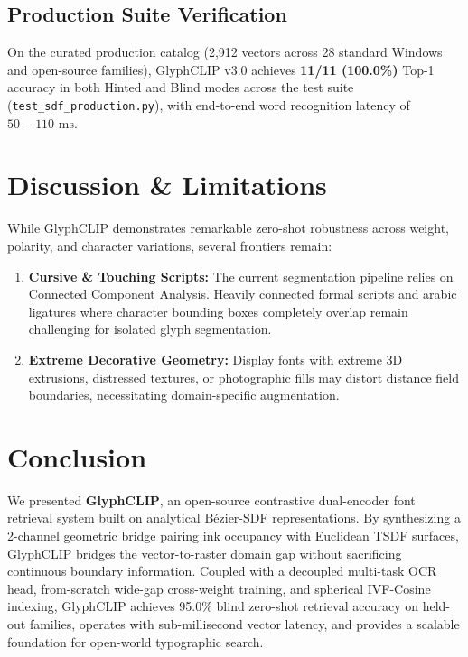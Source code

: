 \documentclass[10pt,twocolumn,letterpaper]{article}
\begin{document}
\subsection{Production Suite Verification}
On the curated production catalog (2,912 vectors across 28 standard Windows and open-source families), GlyphCLIP v3.0 achieves \textbf{11/11 (100.0\%)} Top-1 accuracy in both Hinted and Blind modes across the test suite (\texttt{test\_sdf\_production.py}), with end-to-end word recognition latency of $50 - 110\text{ ms}$.

\section{Discussion \& Limitations}
While GlyphCLIP demonstrates remarkable zero-shot robustness across weight, polarity, and character variations, several frontiers remain:
\begin{enumerate}
    \item \textbf{Cursive \& Touching Scripts:} The current segmentation pipeline relies on Connected Component Analysis. Heavily connected formal scripts and arabic ligatures where character bounding boxes completely overlap remain challenging for isolated glyph segmentation.
    \item \textbf{Extreme Decorative Geometry:} Display fonts with extreme 3D extrusions, distressed textures, or photographic fills may distort distance field boundaries, necessitating domain-specific augmentation.
\end{enumerate}

\section{Conclusion}
We presented \textbf{GlyphCLIP}, an open-source contrastive dual-encoder font retrieval system built on analytical B\'ezier-SDF representations. By synthesizing a 2-channel geometric bridge pairing ink occupancy with Euclidean TSDF surfaces, GlyphCLIP bridges the vector-to-raster domain gap without sacrificing continuous boundary information. Coupled with a decoupled multi-task OCR head, from-scratch wide-gap cross-weight training, and spherical IVF-Cosine indexing, GlyphCLIP achieves 95.0\% blind zero-shot retrieval accuracy on held-out families, operates with sub-millisecond vector latency, and provides a scalable foundation for open-world typographic search.



\end{document}
